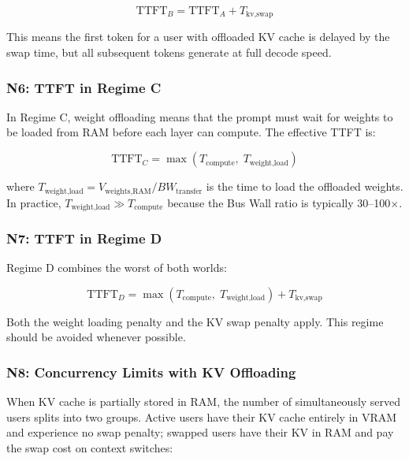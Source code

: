 \documentclass[11pt,a4paper]{article}
\theoremstyle{definition}
\begin{document}
\begin{equation}\label{eq:ttft_b}
\text{TTFT}_B = \text{TTFT}_A + T_{\text{kv,swap}}
\end{equation}

This means the first token for a user with offloaded KV cache is delayed by the swap time, but all subsequent tokens generate at full decode speed.

\subsubsection{N6: TTFT in Regime C}

In Regime C, weight offloading means that the prompt must wait for weights to be loaded from RAM before each layer can compute. The effective TTFT is:

\begin{equation}\label{eq:ttft_c}
\text{TTFT}_C = \max(T_{\text{compute}}, \; T_{\text{weight,load}})
\end{equation}

where $T_{\text{weight,load}} = V_{\text{weights,RAM}} / BW_{\text{transfer}}$ is the time to load the offloaded weights. In practice, $T_{\text{weight,load}} \gg T_{\text{compute}}$ because the Bus Wall ratio is typically 30--100$\times$.

\subsubsection{N7: TTFT in Regime D}

Regime D combines the worst of both worlds:

\begin{equation}\label{eq:ttft_d}
\text{TTFT}_D = \max(T_{\text{compute}}, \; T_{\text{weight,load}}) + T_{\text{kv,swap}}
\end{equation}

Both the weight loading penalty and the KV swap penalty apply. This regime should be avoided whenever possible.

\subsubsection{N8: Concurrency Limits with KV Offloading}

When KV cache is partially stored in RAM, the number of simultaneously served users splits into two groups. Active users have their KV cache entirely in VRAM and experience no swap penalty; swapped users have their KV in RAM and pay the swap cost on context switches:
\end{document}
